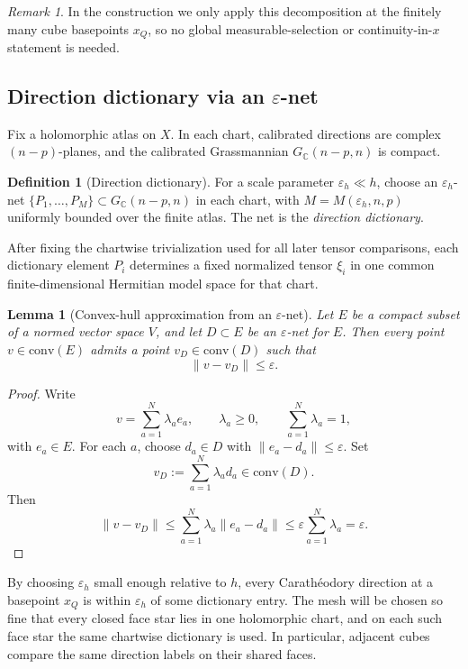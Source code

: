 \documentclass[11pt]{article}
\numberwithin{equation}{section}
\theoremstyle{plain}
\newtheorem{lemma}[theorem]{Lemma}
\theoremstyle{definition}
\newtheorem{definition}[theorem]{Definition}
\theoremstyle{remark}
\newtheorem{remark}[theorem]{Remark}
\newcommand{\C}{\mathbb{C}}
\newcommand{\eps}{\varepsilon}
\begin{document}
\begin{remark}
In the construction we only apply this decomposition at the finitely many cube basepoints $x_Q$, so no global measurable-selection or continuity-in-$x$ statement is needed.
\end{remark}

\subsection{Direction dictionary via an $\eps$-net}

Fix a holomorphic atlas on $X$.  In each chart, calibrated directions are complex $(n-p)$-planes, and the calibrated Grassmannian $G_\C(n-p,n)$ is compact.

\begin{definition}[Direction dictionary]\label{def:dictionary}
For a scale parameter $\eps_h\ll h$, choose an $\eps_h$-net $\{P_1,\dots,P_M\}\subset G_\C(n-p,n)$ in each chart, with $M=M(\eps_h,n,p)$ uniformly bounded over the finite atlas.  The net is the \emph{direction dictionary}.

After fixing the chartwise trivialization used for all later tensor comparisons,
each dictionary element $P_i$ determines a fixed normalized tensor $\xi_i$ in one
common finite-dimensional Hermitian model space for that chart.
\end{definition}

\begin{lemma}[Convex-hull approximation from an $\eps$-net]\label{lem:convex-net}
Let $E$ be a compact subset of a normed vector space $V$, and let $D\subset E$ be an $\eps$-net for $E$.  Then every point $v\in \mathrm{conv}(E)$ admits a point $v_D\in \mathrm{conv}(D)$ such that
\[
\|v-v_D\|\le \eps.
\]
\end{lemma}

\begin{proof}
Write
\[
v=\sum_{a=1}^N \lambda_a e_a,
\qquad
\lambda_a\ge 0,
\qquad
\sum_{a=1}^N \lambda_a=1,
\]
with $e_a\in E$.  For each $a$, choose $d_a\in D$ with $\|e_a-d_a\|\le \eps$.  Set
\[
v_D:=\sum_{a=1}^N \lambda_a d_a\in \mathrm{conv}(D).
\]
Then
\[
\|v-v_D\|
\le
\sum_{a=1}^N \lambda_a\|e_a-d_a\|
\le
\eps\sum_{a=1}^N \lambda_a
=
\eps.
\]
\end{proof}

By choosing $\eps_h$ small enough relative to $h$, every Carath\'eodory direction at a basepoint $x_Q$ is within $\eps_h$ of some dictionary entry.  The mesh will be chosen so fine that every closed face star lies in one holomorphic chart, and on each such face star the same chartwise dictionary is used.  In particular, adjacent cubes compare the same direction labels on their shared faces.
\end{document}
